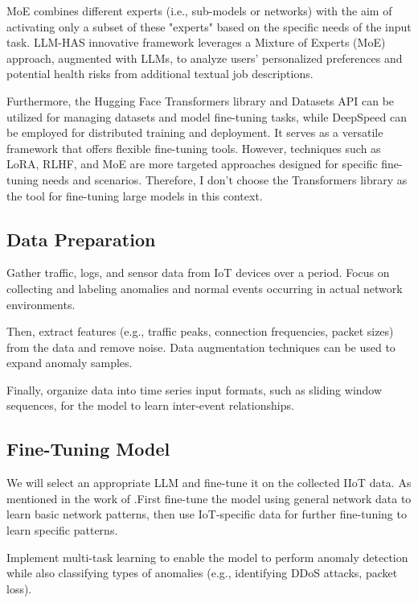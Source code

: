 \documentclass[usenatbib]{tjaa}
\begin{document}
MoE combines different experts (i.e., sub-models or networks)
with the aim of activating only a subset of these "experts" based
on the specific needs of the input task.
LLM-HAS innovative framework leverages a Mixture
of Experts (MoE) approach, augmented with LLMs, to analyze
users’ personalized preferences and potential health risks from
additional textual job descriptions\citep{gao2024guiding}.

Furthermore, the Hugging Face Transformers library and Datasets API can be utilized for
managing datasets and model fine-tuning tasks,
while DeepSpeed can be employed for distributed training and deployment.
It serves as a versatile framework that offers flexible fine-tuning tools.
However, techniques such as LoRA, RLHF, and MoE are more targeted approaches
designed for specific fine-tuning needs and scenarios.
Therefore, I don't choose the Transformers library as the tool for fine-tuning
large models in this context.

\subsection{Data Preparation}

Gather traffic, logs, and sensor data from IoT devices over a period.
Focus on collecting and labeling anomalies and normal events occurring
in actual network environments.

Then, extract features (e.g., traffic peaks, connection frequencies, packet sizes)
from the data and remove noise. Data augmentation techniques can be
used to expand anomaly samples.

Finally, organize data into time series input formats,
such as sliding window sequences, for the model to learn
inter-event relationships.

\subsection{Fine-Tuning Model}

We will select an appropriate LLM and fine-tune it on the collected IIoT data. As mentioned in the work of
\citet{sarabi2023llm}.First fine-tune the model using general network data to learn basic network patterns,
then use IoT-specific data for further fine-tuning to learn specific patterns.

Implement multi-task learning to enable the model to perform anomaly detection while also
classifying types of anomalies (e.g., identifying DDoS attacks, packet loss).
\end{document}
